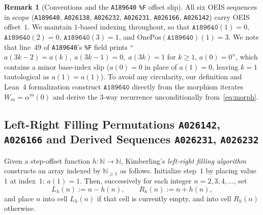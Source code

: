 \documentclass[11pt]{article}
\theoremstyle{definition}
\newtheorem{remark}[theorem]{Remark}
\newcommand{\N}{\mathbb{N}}
\newcommand{\seq}[1]{\texttt{#1}}
\newcommand{\OnePos}{\mathrm{OnePos}}
\begin{document}
\begin{remark}[Conventions and the \seq{A189640} \texttt{\%F} offset slip]
\label{rem:conventions}
All six OEIS sequences in scope (\seq{A189640}, \seq{A026138}, \seq{A026232}, \seq{A026231}, \seq{A026166}, \seq{A026142}) carry OEIS offset~$1$. We maintain $1$-based indexing throughout, so that $\seq{A189640}(1) = 0$, $\seq{A189640}(2) = 0$, $\seq{A189640}(3) = 1$, and $\OnePos(\seq{A189640})(1) = 3$. We note that line~49 of \seq{A189640}'s \texttt{\%F} field prints ``$a(3k-2)=a(k),\; a(3k-1)=0,\; a(3k)=1$ for $k \ge 1$, $a(0)=0$'', which contains a minor base-index slip ($a(0)=0$ in place of $a(1)=0$, leaving $k=1$ tautological as $a(1)=a(1)$). To avoid any circularity, our definition and Lean~4 formalization construct $\seq{A189640}$ directly from the morphism iterates $W_m = \alpha^m(0)$ and derive the $3$-way recurrence unconditionally from~\eqref{eq:morph}.
\end{remark}

\subsection{Left-Right Filling Permutations \seq{A026142}, \seq{A026166} and Derived Sequences \seq{A026231}, \seq{A026232}}

Given a step-offset function $h : \N \to \N$, Kimberling's \emph{left-right filling algorithm} constructs an array indexed by $\N_{\ge 1}$ as follows. Initialize step~$1$ by placing value~$1$ at index~$1$: $a(1) = 1$. Then, successively for each integer $n = 2, 3, 4, \dots$, set
\begin{equation}
\label{eq:lr-rule}
L_h(n) := n - h(n), \qquad R_h(n) := n + h(n),
\end{equation}
and place $n$ into cell $L_h(n)$ if that cell is currently empty, and into cell $R_h(n)$ otherwise.
\end{document}
